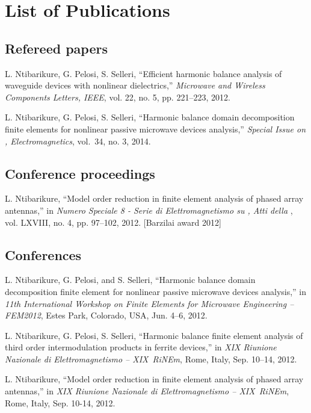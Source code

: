 \chapter*{List of Publications}%
\section*{Refereed papers}
\begin{enumerate}[label={[\arabic*]}]
\item  L. Ntibarikure, G. Pelosi, S. Selleri, ``Efficient harmonic balance analysis of waveguide devices with nonlinear dielectrics,'' \emph{Microwave and Wireless Components Letters, IEEE}, vol. 22, no. 5, pp. 221--223, 2012.
\item  L. Ntibarikure, G. Pelosi, S. Selleri, ``Harmonic balance domain decomposition finite elements for nonlinear passive microwave devices analysis,'' \emph{Special Issue on , Electromagnetics}, vol.~34, no. 3, 2014.
\end{enumerate}

\section*{Conference proceedings}
\begin{enumerate}[label={[\arabic*]}]
\item  L. Ntibarikure, ``Model order reduction in finite element analysis of phased array antennas,'' in \emph{Numero Speciale 8 - Serie di Elettromagnetismo su , Atti della }, vol. LXVIII, no. 4, pp. 97--102, 2012. [Barzilai award 2012]
\end{enumerate}


\section*{Conferences}
\begin{enumerate}[label={[\arabic*]}]
\item L. Ntibarikure, G. Pelosi, and S. Selleri, ``Harmonic balance domain decomposition finite element for nonlinear passive microwave devices analysis,'' in \emph{11th International Workshop on Finite Elements for Microwave Engineering -- FEM2012}, Estes Park, Colorado, USA, Jun. 4--6, 2012.
\item L. Ntibarikure, G. Pelosi, S. Selleri, ``Harmonic balance finite element analysis of third order intermodulation products in ferrite devices,'' in \emph{XIX Riunione Nazionale di Elettromagnetismo -- XIX~RiNEm}, Rome, Italy, Sep. 10--14, 2012.
\item  L. Ntibarikure, ``Model order reduction in finite element analysis of phased array antennas,'' in \emph{XIX Riunione Nazionale di Elettromagnetismo -- XIX~RiNEm}, Rome, Italy, Sep. 10-14, 2012.
\end{enumerate}
